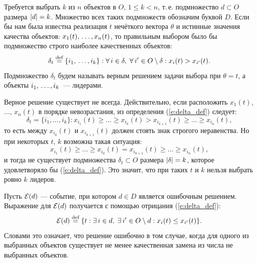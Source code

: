 Требуется выбрать $k$ из $n$ объектов в $O$, $1 \leq k < n$, т.\,е. подмножество $d \subset O$ размера $\left| d \right| = k$. Множество всех таких подмножеств обозначим буквой $D$. Если бы нам была известна реализация $t$ нечёткого вектора $\theta$ и истинные значения качества объектов: $x_1(t), \, \ldots, x_n(t)$, то правильным выбором было бы подмножество строго наиболее качественных объектов:
\begin{equation}
    \label{e:delta_def}
    \delta_{t} \overset{\text{def}}{=} \{i_1, \, \ldots, i_k\}: \forall\, i \in \delta,\; \forall\, i' \in O \setminus \delta: x_i(t) > x_{i'}(t). 
\end{equation}
Подмножество $\delta_{t}$ будем называть верным решением задачи выбора при $\theta = t$, а объекты $i_1, \, \ldots, i_k$~--- лидерами. %

Верное решение существует не всегда. Действительно, если расположить $x_1(t)$, $\ldots$, $x_n(t)$ в порядке невозрастания, из определения (\ref{e:delta_def}) следует:
\begin{equation}
   \label{e:right_order_strict}
    \delta_t = \{i_1, \ldots, i_k\}: x_{i_1}(t) \geq \ldots \geq x_{i_k}(t) > x_{i_{k+1}}(t) \geq \ldots \geq x_{i_n}(t),   
\end{equation}
то есть между $x_{i_k}(t)$ и $x_{i_{k+1}}(t)$ должен стоять знак строгого неравенства. Но при некоторых $t$, $k$ возможна такая ситуация:
\begin{equation}
    \label{e:right_order_fail}
    x_{i_1}(t) \geq \ldots \geq x_{i_k}(t) = x_{i_{k+1}}(t) \geq \ldots \geq x_{i_n}(t),    
\end{equation}
и тогда не существует подмножества $\delta_t \subset O$ размера $\left| \delta \right| = k$, которое  удовлетворяло бы (\ref{e:delta_def}). Это значит, что при таких $t$ и $k$ нельзя выбрать ровно $k$ лидеров. 

Пусть $\mathcal{E}(d)$ --- событие, при котором $d \in D$ является ошибочным решением. Выражение для $\mathcal{E}(d)$ получается с помощью отрицания (\ref{e:delta_def}):
\begin{equation}
  \label{e:Eps_d_def}
  \mathcal{E}(d) \overset{\text{def}}{=} \{t: \exists\, i \in d,\; \exists\, i' \in O \setminus d: x_i(t) \leq x_{i'}(t)\}.
\end{equation}
Словами это означает, что решение ошибочно в том случае, когда для одного из выбранных объектов существует не менее качественная замена из числа не выбранных объектов.

